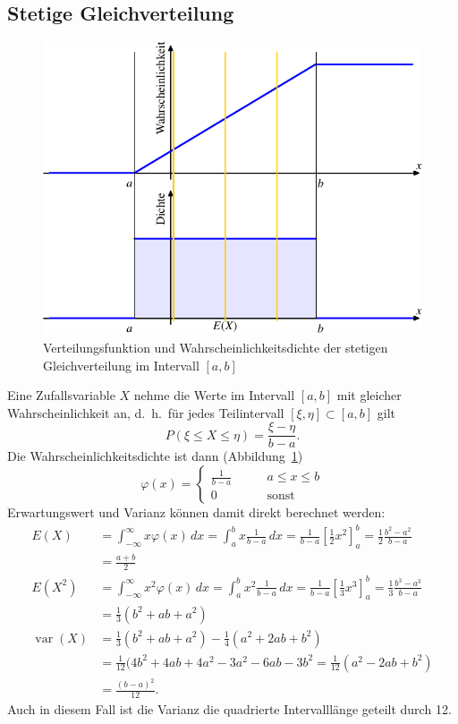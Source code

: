 \subsection{Stetige Gleichverteilung}
\begin{figure}
\centering
\includegraphics{images/verteilungsfunktion-7.pdf}
\caption{Verteilungsfunktion und Wahrscheinlichkeitsdichte der stetigen
Gleichverteilung im Intervall $[a,b]$
\label{stetige-gleichverteilung}}
\end{figure}
Eine Zufallsvariable $X$ nehme die Werte im Intervall $[a,b]$
mit gleicher Wahrscheinlichkeit an, d.~h.~für jedes Teilintervall
$[\xi,\eta]\subset[a,b]$ gilt 
\[
P(\xi\le X\le \eta)=\frac{\xi-\eta}{b-a}.
\]
Die Wahrscheinlichkeitsdichte ist dann (Abbildung~\ref{stetige-gleichverteilung})
\[
\varphi(x)=\begin{cases}
\displaystyle \frac1{b-a}&\qquad a\le x\le b\\
0&\qquad \text{sonst}
\end{cases}
\]
Erwartungswert und Varianz können damit direkt berechnet werden:
{\allowdisplaybreaks
\begin{align*}
E(X)
&=
\int_{-\infty}^\infty x\varphi(x)\,dx
=
\int_a^bx\frac1{b-a}\,dx
=
\frac1{b-a}\left[\frac12x^2\right]_a^b
=
\frac12\frac{b^2-a^2}{b-a}
\\
&=
\frac{a+b}2
\\
E(X^2)
&=
\int_{-\infty}^{\infty}x^2\varphi(x)\,dx
=
\int_a^bx^2\frac1{b-a}\,dx
=
\frac1{b-a}\left[\frac13x^3\right]_a^b
=
\frac13\frac{b^3-a^3}{b-a}
\\
&=
\frac13(b^2+ab+a^2)
\\
\operatorname{var}(X)
&=
\frac13(b^2+ab+a^2)
-
\frac14(a^2+2ab+b^2)
\\
&=
\frac1{12}(4b^2+4ab+4a^2-3a^2-6ab-3b^2
=
\frac1{12}(a^2-2ab+b^2)
\\
&=
\frac{(b-a)^2}{12}.
\end{align*}
}
Auch in diesem Fall ist die Varianz die quadrierte Intervalllänge
geteilt durch 12.

